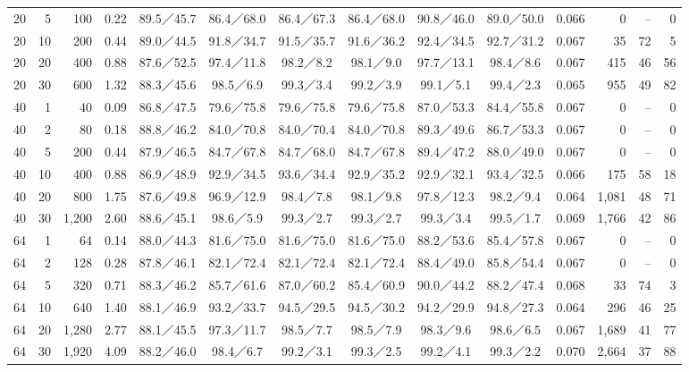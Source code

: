 {\begin{tabular}{@{}rrrr|cccccc|c|rrr@{}}
20 & 5 & 100 & 0.22 & 89.5／45.7 & 86.4／68.0 & 86.4／67.3 & 86.4／68.0 & 90.8／46.0 & 89.0／50.0 & 0.066 & 0 & -- & 0 \\
20 & 10 & 200 & 0.44 & 89.0／44.5 & 91.8／34.7 & 91.5／35.7 & 91.6／36.2 & 92.4／34.5 & 92.7／31.2 & 0.067 & 35 & 72 & 5 \\
20 & 20 & 400 & 0.88 & 87.6／52.5 & 97.4／11.8 & 98.2／8.2 & 98.1／9.0 & 97.7／13.1 & 98.4／8.6 & 0.067 & 415 & 46 & 56 \\
20 & 30 & 600 & 1.32 & 88.3／45.6 & 98.5／6.9 & 99.3／3.4 & 99.2／3.9 & 99.1／5.1 & 99.4／2.3 & 0.065 & 955 & 49 & 82 \\
40 & 1 & 40 & 0.09 & 86.8／47.5 & 79.6／75.8 & 79.6／75.8 & 79.6／75.8 & 87.0／53.3 & 84.4／55.8 & 0.067 & 0 & -- & 0 \\
40 & 2 & 80 & 0.18 & 88.8／46.2 & 84.0／70.8 & 84.0／70.4 & 84.0／70.8 & 89.3／49.6 & 86.7／53.3 & 0.067 & 0 & -- & 0 \\
40 & 5 & 200 & 0.44 & 87.9／46.5 & 84.7／67.8 & 84.7／68.0 & 84.7／67.8 & 89.4／47.2 & 88.0／49.0 & 0.067 & 0 & -- & 0 \\
40 & 10 & 400 & 0.88 & 86.9／48.9 & 92.9／34.5 & 93.6／34.4 & 92.9／35.2 & 92.9／32.1 & 93.4／32.5 & 0.066 & 175 & 58 & 18 \\
40 & 20 & 800 & 1.75 & 87.6／49.8 & 96.9／12.9 & 98.4／7.8 & 98.1／9.8 & 97.8／12.3 & 98.2／9.4 & 0.064 & 1,081 & 48 & 71 \\
40 & 30 & 1,200 & 2.60 & 88.6／45.1 & 98.6／5.9 & 99.3／2.7 & 99.3／2.7 & 99.3／3.4 & 99.5／1.7 & 0.069 & 1,766 & 42 & 86 \\
64 & 1 & 64 & 0.14 & 88.0／44.3 & 81.6／75.0 & 81.6／75.0 & 81.6／75.0 & 88.2／53.6 & 85.4／57.8 & 0.067 & 0 & -- & 0 \\
64 & 2 & 128 & 0.28 & 87.8／46.1 & 82.1／72.4 & 82.1／72.4 & 82.1／72.4 & 88.4／49.0 & 85.8／54.4 & 0.067 & 0 & -- & 0 \\
64 & 5 & 320 & 0.71 & 88.3／46.2 & 85.7／61.6 & 87.0／60.2 & 85.4／60.9 & 90.0／44.2 & 88.2／47.4 & 0.068 & 33 & 74 & 3 \\
64 & 10 & 640 & 1.40 & 88.1／46.9 & 93.2／33.7 & 94.5／29.5 & 94.5／30.2 & 94.2／29.9 & 94.8／27.3 & 0.064 & 296 & 46 & 25 \\
64 & 20 & 1,280 & 2.77 & 88.1／45.5 & 97.3／11.7 & 98.5／7.7 & 98.5／7.9 & 98.3／9.6 & 98.6／6.5 & 0.067 & 1,689 & 41 & 77 \\
64 & 30 & 1,920 & 4.09 & 88.2／46.0 & 98.4／6.7 & 99.2／3.1 & 99.3／2.5 & 99.2／4.1 & 99.3／2.2 & 0.070 & 2,664 & 37 & 88 \\
\hline
\end{tabular}}%
